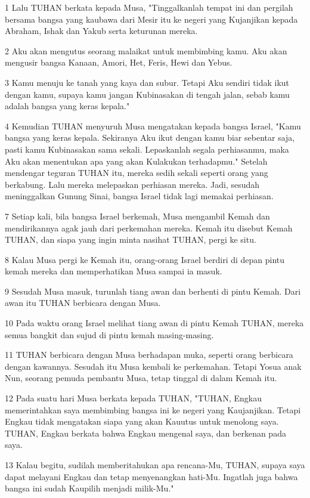 \par 1 Lalu TUHAN berkata kepada Musa, "Tinggalkanlah tempat ini dan pergilah bersama bangsa yang kaubawa dari Mesir itu ke negeri yang Kujanjikan kepada Abraham, Ishak dan Yakub serta keturunan mereka.
\par 2 Aku akan mengutus seorang malaikat untuk membimbing kamu. Aku akan mengusir bangsa Kanaan, Amori, Het, Feris, Hewi dan Yebus.
\par 3 Kamu menuju ke tanah yang kaya dan subur. Tetapi Aku sendiri tidak ikut dengan kamu, supaya kamu jangan Kubinasakan di tengah jalan, sebab kamu adalah bangsa yang keras kepala."
\par 4 Kemudian TUHAN menyuruh Musa mengatakan kepada bangsa Israel, "Kamu bangsa yang keras kepala. Sekiranya Aku ikut dengan kamu biar sebentar saja, pasti kamu Kubinasakan sama sekali. Lepaskanlah segala perhiasanmu, maka Aku akan menentukan apa yang akan Kulakukan terhadapmu." Setelah mendengar teguran TUHAN itu, mereka sedih sekali seperti orang yang berkabung. Lalu mereka melepaskan perhiasan mereka. Jadi, sesudah meninggalkan Gunung Sinai, bangsa Israel tidak lagi memakai perhiasan.
\par 7 Setiap kali, bila bangsa Israel berkemah, Musa mengambil Kemah dan mendirikannya agak jauh dari perkemahan mereka. Kemah itu disebut Kemah TUHAN, dan siapa yang ingin minta nasihat TUHAN, pergi ke situ.
\par 8 Kalau Musa pergi ke Kemah itu, orang-orang Israel berdiri di depan pintu kemah mereka dan memperhatikan Musa sampai ia masuk.
\par 9 Sesudah Musa masuk, turunlah tiang awan dan berhenti di pintu Kemah. Dari awan itu TUHAN berbicara dengan Musa.
\par 10 Pada waktu orang Israel melihat tiang awan di pintu Kemah TUHAN, mereka semua bangkit dan sujud di pintu kemah masing-masing.
\par 11 TUHAN berbicara dengan Musa berhadapan muka, seperti orang berbicara dengan kawannya. Sesudah itu Musa kembali ke perkemahan. Tetapi Yosua anak Nun, seorang pemuda pembantu Musa, tetap tinggal di dalam Kemah itu.
\par 12 Pada suatu hari Musa berkata kepada TUHAN, "TUHAN, Engkau memerintahkan saya membimbing bangsa ini ke negeri yang Kaujanjikan. Tetapi Engkau tidak mengatakan siapa yang akan Kauutus untuk menolong saya. TUHAN, Engkau berkata bahwa Engkau mengenal saya, dan berkenan pada saya.
\par 13 Kalau begitu, sudilah memberitahukan apa rencana-Mu, TUHAN, supaya saya dapat melayani Engkau dan tetap menyenangkan hati-Mu. Ingatlah juga bahwa bangsa ini sudah Kaupilih menjadi milik-Mu."
